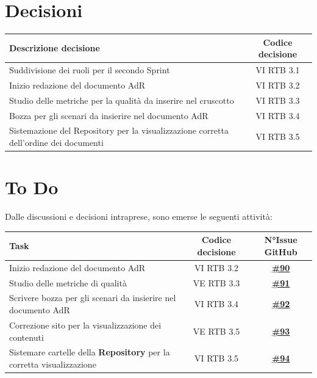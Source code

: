 \documentclass[a4paper,12pt]{article}
\newcommand{\ignoreglossary}{}
\begin{document}
\section{Decisioni}
\begin{center}
\small
\renewcommand{\arraystretch}{1.2} 
\begin{tabular}{|p{}|c|}
\hline
\rowcolor{gray!60} 
\textbf{Descrizione decisione} & \textbf{Codice decisione} \\
\hline
\rowcolor{white}
Suddivisione dei ruoli per il secondo Sprint & VI \ignoreglossary{RTB} 3.1 \\
\hline
\rowcolor{gray!20}
Inizio redazione del documento AdR &  VI \ignoreglossary{RTB} 3.2 \\
\hline
\rowcolor{white}
Studio delle metriche per la qualità da inserire nel cruscotto &  VI \ignoreglossary{RTB} 3.3\\
\hline
\rowcolor{gray!20}
Bozza per gli scenari da insierire nel documento AdR &  VI \ignoreglossary{RTB} 3.4 \\
\hline
\rowcolor{white}
Sistemazione del Repository per la visualizzazione corretta dell'ordine dei documenti &  VI \ignoreglossary{RTB} 3.5\\
\hline
\end{tabular}
\end{center}

\section{To Do}
Dalle discussioni e decisioni intraprese, sono emerse le seguenti attività:

\begin{center}
\small
\renewcommand{\arraystretch}{1.2} 
\begin{tabular}{|p{}|c|c|}
\hline
\rowcolor{gray!60} 
\textbf{Task} & \textbf{Codice decisione} & \textbf{N°Issue GitHub} \\
\hline
\rowcolor{white}
Inizio redazione del documento AdR & VI \ignoreglossary{RTB} 3.2 & \href{https://github.com/SWE-BitByBit/SWE-docs/issues/90}{\textbf{\#90}} \\
\hline
\rowcolor{gray!20}
Studio delle metriche di qualità & VE \ignoreglossary{RTB} 3.3 & \href{https://github.com/SWE-BitByBit/SWE-docs/issues/91}{\textbf{\#91}} \\
\hline
\rowcolor{white}
Scrivere bozza per gli scenari da insierire nel documento AdR & VI \ignoreglossary{RTB} 3.4 & \href{https://github.com/SWE-BitByBit/SWE-docs/issues/92}{\textbf{\#92}} \\
\hline
\rowcolor{gray!20}
Correzione sito per la visualizzazione dei contenuti & VE \ignoreglossary{RTB} 3.5 & \href{https://github.com/SWE-BitByBit/SWE-docs/issues/93}{\textbf{\#93}} \\
\hline
\rowcolor{white}
Sistemare cartelle della \textbf{Repository} per la corretta visualizzazione & VI \ignoreglossary{RTB} 3.5 & \href{https://github.com/SWE-BitByBit/SWE-docs/issues/94}{\textbf{\#94}} \\
\hline
\end{tabular}
\end{center}
\end{document}
